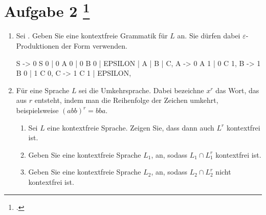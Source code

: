 \documentclass{lehramt-informatik-aufgabe}
\begin{document}
\section{Aufgabe 2
\footcite{examen:66115:2020:09}}

\begin{enumerate}


\item Sei . Geben Sie eine kontextfreie Grammatik für $L$
an. Sie dürfen dabei $\varepsilon$-Produktionen der Form
 verwenden.

\begin{liAntwort}
\begin{liProduktionsRegeln}
S -> 0 S 0 | 0 A 0 | 0 B 0 | EPSILON | A | B | C,
A -> 0 A 1 | 0 C 1,
B -> 1 B 0 | 1 C 0,
C -> 1 C 1 | EPSILON,
\end{liProduktionsRegeln}
\end{liAntwort}


\item Für eine Sprache $L$ sei  die
Umkehrsprache. Dabei bezeichne $x^r$ das Wort, das aus $r$ entsteht,
indem man die Reihenfolge der Zeichen umkehrt, beispielsweise $(abb)^r =
bba$.

\begin{enumerate}


\item Sei $L$ eine kontextfreie Sprache. Zeigen Sie, dass dann auch
$L^r$ kontextfrei ist.


\item Geben Sie eine kontextfreie Sprache $L_1$, an, sodass $L_1 \cap
L^r_1$ kontextfrei ist.


\item Geben Sie eine kontextfreie Sprache $L_2$, an, sodass $L_2 \cap
L^r_2$ nicht kontextfrei ist.

\end{enumerate}
\end{enumerate}
\end{document}
